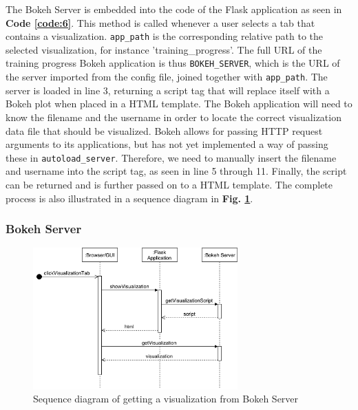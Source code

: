 \noindent The Bokeh Server is embedded into the code of the Flask application as seen in \textbf{Code \ref{code:6}}. This method is called whenever a user selects a tab that contains a visualization. \texttt{app\_path} is the corresponding relative path to the selected visualization, for instance 'training\_progress'. The full URL of the training progress Bokeh application is thus \texttt{BOKEH\_SERVER}, which is the URL of the server imported from the config file, joined together with \texttt{app\_path}. The server is loaded in line 3, returning a script tag that will replace itself with a Bokeh plot when placed in a HTML template. The Bokeh application will need to know the filename and the username in order to locate the correct visualization data file that should be visualized. Bokeh allows for passing HTTP request arguments to its applications, but has not yet implemented a way of passing these in \texttt{autoload\_server}. Therefore, we need to manually insert the filename and username into the script tag, as seen in line 5 through 11. Finally, the script can be returned and is further passed on to a HTML template. The complete process is also illustrated in a sequence diagram in \textbf{Fig. \ref{bokeh-server}}.


\subsubsection{Bokeh Server}

\begin{figure}[h!]
    \centering
        \includegraphics[width=0.7\textwidth]{fig/sequence-bokeh.pdf}
        \caption{Sequence diagram of getting a visualization from Bokeh Server}
        \label{bokeh-server}
\end{figure}

